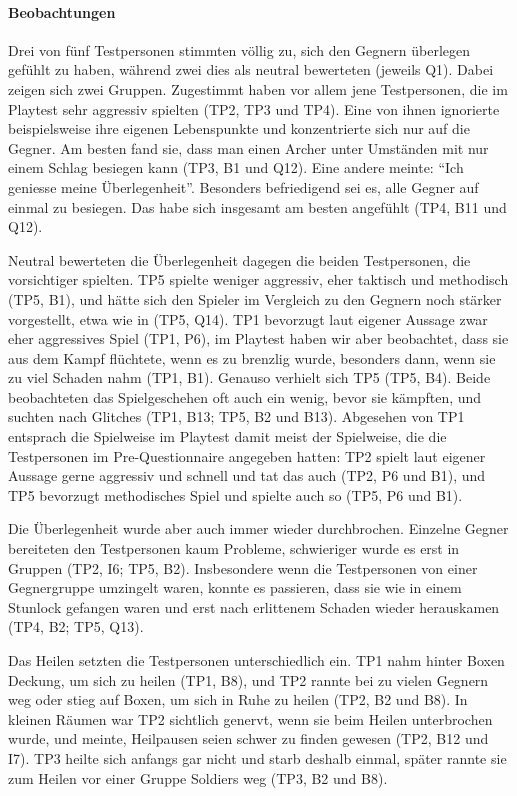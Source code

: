 \documentclass[../Main.tex]{subfiles}
\begin{document}
\paragraph{Beobachtungen}
Drei von fünf Testpersonen stimmten völlig zu, sich den Gegnern überlegen gefühlt zu haben, während zwei dies als neutral bewerteten (jeweils Q1). Dabei zeigen sich zwei Gruppen. Zugestimmt haben vor allem jene Testpersonen, die im Playtest sehr aggressiv spielten (TP2, TP3 und TP4). Eine von ihnen ignorierte beispielsweise ihre eigenen Lebenspunkte und konzentrierte sich nur auf die Gegner. Am besten fand sie, dass man einen Archer unter Umständen mit nur einem Schlag besiegen kann (TP3, B1 und Q12). Eine andere meinte: \enquote{Ich geniesse meine Überlegenheit}. Besonders befriedigend sei es, alle Gegner auf einmal zu besiegen. Das habe sich insgesamt am besten angefühlt (TP4, B11 und Q12).

Neutral bewerteten die Überlegenheit dagegen die beiden Testpersonen, die vorsichtiger spielten. TP5 spielte weniger aggressiv, eher taktisch und methodisch (TP5, B1), und hätte sich den Spieler im Vergleich zu den Gegnern noch stärker vorgestellt, etwa wie in \autocite{omegaforce_hyrulewarriors_2014} (TP5, Q14). TP1 bevorzugt laut eigener Aussage zwar eher aggressives Spiel (TP1, P6), im Playtest haben wir aber beobachtet, dass sie aus dem Kampf flüchtete, wenn es zu brenzlig wurde, besonders dann, wenn sie zu viel Schaden nahm (TP1, B1). Genauso verhielt sich TP5 (TP5, B4). Beide beobachteten das Spielgeschehen oft auch ein wenig, bevor sie kämpften, und suchten nach Glitches (TP1, B13; TP5, B2 und B13). Abgesehen von TP1 entsprach die Spielweise im Playtest damit meist der Spielweise, die die Testpersonen im Pre-Questionnaire angegeben hatten: TP2 spielt laut eigener Aussage gerne aggressiv und schnell und tat das auch (TP2, P6 und B1), und TP5 bevorzugt methodisches Spiel und spielte auch so (TP5, P6 und B1).

Die Überlegenheit wurde aber auch immer wieder durchbrochen. Einzelne Gegner bereiteten den Testpersonen kaum Probleme, schwieriger wurde es erst in Gruppen (TP2, I6; TP5, B2). Insbesondere wenn die Testpersonen von einer Gegnergruppe umzingelt waren, konnte es passieren, dass sie wie in einem Stunlock gefangen waren und erst nach erlittenem Schaden wieder herauskamen (TP4, B2; TP5, Q13).

Das Heilen setzten die Testpersonen unterschiedlich ein. TP1 nahm hinter Boxen Deckung, um sich zu heilen (TP1, B8), und TP2 rannte bei zu vielen Gegnern weg oder stieg auf Boxen, um sich in Ruhe zu heilen (TP2, B2 und B8). In kleinen Räumen war TP2 sichtlich genervt, wenn sie beim Heilen unterbrochen wurde, und meinte, Heilpausen seien schwer zu finden gewesen (TP2, B12 und I7). TP3 heilte sich anfangs gar nicht und starb deshalb einmal, später rannte sie zum Heilen vor einer Gruppe Soldiers weg (TP3, B2 und B8).
\end{document}
